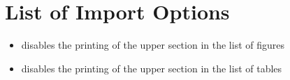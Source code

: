 \documentclass{report}
\begin{document}
\section{List of Import Options}
\begin{itemize}
    \item {} disables the printing of the upper section in the list of figures
    \item {} disables the printing of the upper section in the list of tables
\end{itemize}


\imtaMakeCover
\end{document}
